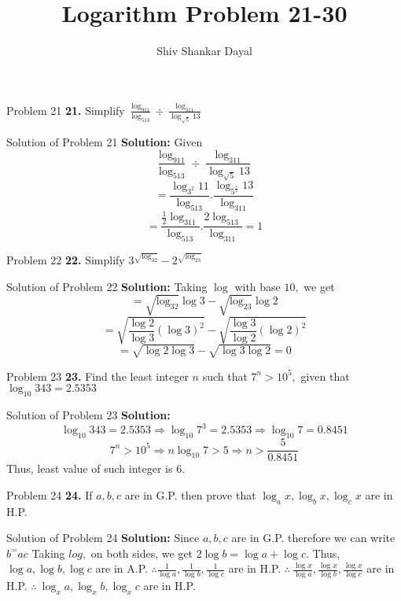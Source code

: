 \documentclass[aspectratio=1610,8pt]{beamer}
\title{Logarithm Problem 21-30}
\author[Shiv Shankar Dayal]{Shiv Shankar Dayal}
\begin{document}
\begin{frame}
  \titlepage
\end{frame}
\begin{frame}{Problem 21}
  \textbf{21.} Simplify $\frac{\log_911}{\log_513}\div\frac{\log_311}{\log_{\sqrt{5}}13}$
\end{frame}
\begin{frame}{Solution of Problem 21}
  \textbf{Solution:} Given $$\frac{\log_911}{\log_513}\div\frac{\log_311}{\log_{\sqrt{5}}13}$$
  $$= \frac{\log_{3^2}11}{\log_513}.\frac{\log_{5^{\frac{1}{2}}}13}{\log_311}$$
  $$= \frac{\frac{1}{2}\log_311}{\log_513}.\frac{2\log_513}{\log_311} = 1$$
\end{frame}
\begin{frame}{Problem 22}
  \textbf{22.} Simplify $3^{\sqrt{\log_32}} - 2^{\sqrt{\log_23}}$
\end{frame}
\begin{frame}{Solution of Problem 22}
  \textbf{Solution:} Taking $\log$ with base $10,$ we get
  $$= \sqrt{\log_32}\log 3 - \sqrt{\log_23}\log 2$$
  $$= \sqrt{\frac{\log2}{\log3}(\log 3)^2} - \sqrt{\frac{\log3}{\log2}(\log2)^2}$$
  $$=\sqrt{\log2\log3} - \sqrt{\log3\log2} = 0$$
\end{frame}
\begin{frame}{Problem 23}
  \textbf{23.} Find the least integer $n$ such that $7^n > 10^5,$ given that $\log_{10}343 = 2.5353$
\end{frame}
\begin{frame}{Solution of Problem 23}
  \textbf{Solution:} $$\log_{10}343 = 2.5353 \Rightarrow \log_{10}7^3 = 2.5353 \Rightarrow \log_{10}7 = 0.8451$$
  $$7^n > 10^5 \Rightarrow n\log_{10}7 > 5\Rightarrow n > \frac{5}{0.8451}$$
  Thus, least value of such integer is $6.$
\end{frame}
\begin{frame}{Problem 24}
  \textbf{24.} If $a,b,c$ are in G.P. then prove that $\log_ax, \log_bx,
  \log_cx$ are in H.P.
\end{frame}
\begin{frame}{Solution of Problem 24}
  \textbf{Solution:} Since $a,b,c$ are in G.P. therefore we can write $b^ = ac$
  \linebreak\linebreak
  Taking $log,$ on both sides, we get $2\log b = \log a + \log c.$
  Thus, $\log a, \log b, \log c$ are in A.P.
  \linebreak\linebreak
  $\therefore \frac{1}{\log a}, \frac{1}{\log b}, \frac{1}{\log c}$ are in H.P.
  \linebreak\linebreak
  $\therefore~ \frac{\log x}{\log a}, \frac{\log x}{\log b}, \frac{\log x}{\log c}$ are in H.P.
  \linebreak\linebreak
  $\therefore~\log_xa, \log_xb, \log_xc$ are in H.P.
\end{frame}
\end{document}
